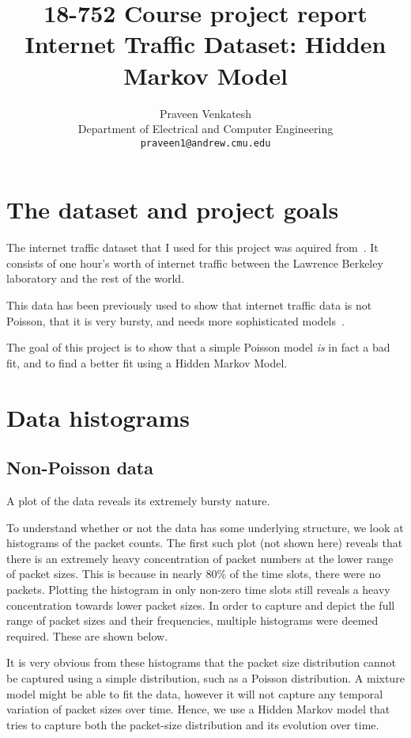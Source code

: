 \documentclass[11pt, twoside]{article}
\title{
	18-752 Course project report\\
	Internet Traffic Dataset: Hidden Markov Model
}
\author{
	Praveen Venkatesh\\
	Department of Electrical and Computer Engineering\\
	\texttt{praveen1@andrew.cmu.edu}
}
\begin{document}
\maketitle

\section{The dataset and project goals}

The internet traffic dataset that I used for this project was aquired from~\cite{Somebody}. It consists of one hour's worth of internet traffic between the Lawrence Berkeley laboratory and the rest of the world.

This data has been previously used to show that internet traffic data is not Poisson, that it is very bursty, and needs more sophisticated models~\cite{theotherguy}.

The goal of this project is to show that a simple Poisson model \emph{is} in fact a bad fit, and to find a better fit using a Hidden Markov Model.

\section{Data histograms}

\subsection{Non-Poisson data}

A plot of the data reveals its extremely bursty nature.

To understand whether or not the data has some underlying structure, we look at histograms of the packet counts. The first such plot (not shown here) reveals that there is an extremely heavy concentration of packet numbers at the lower range of packet sizes. This is because in nearly 80\% of the time slots, there were no packets. Plotting the histogram in only non-zero time slots still reveals a heavy concentration towards lower packet sizes. In order to capture and depict the full range of packet sizes and their frequencies, multiple histograms were deemed required. These are shown below.

It is very obvious from these histograms that the packet size distribution cannot be captured using a simple distribution, such as a Poisson distribution. A mixture model might be able to fit the data, however it will not capture any temporal variation of packet sizes over time. Hence, we use a Hidden Markov model that tries to capture both the packet-size distribution and its evolution over time.
\end{document}
